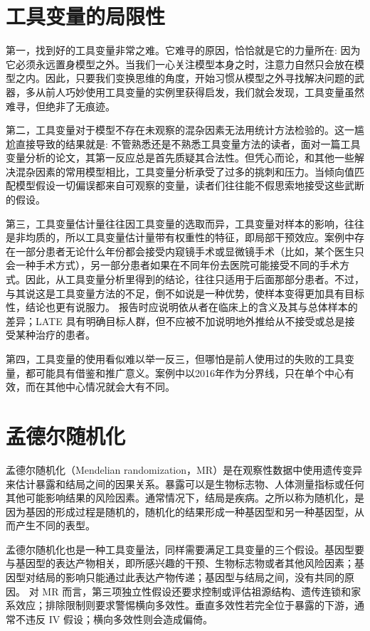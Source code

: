 \documentclass[
  chinese-hans,
  letterpaper,
  DIV=11,
  numbers=noendperiod]{scrreprt}
\begin{document}
\section{工具变量的局限性}\label{ux5de5ux5177ux53d8ux91cfux7684ux5c40ux9650ux6027}

第一，找到好的工具变量非常之难。它难寻的原因，恰恰就是它的力量所在:
因为它必须永远置身模型之外。当我们一心关注模型本身之时，注意力自然只会放在模型之内。因此，只要我们变换思维的角度，开始习惯从模型之外寻找解决问题的武器，多从前人巧妙使用工具变量的实例里获得启发，我们就会发现，工具变量虽然难寻，但绝非了无痕迹。

第二，工具变量对于模型不存在未观察的混杂因素无法用统计方法检验的。这一尴尬直接导致的结果就是:
不管熟悉还是不熟悉工具变量方法的读者，面对一篇工具变量分析的论文，其第一反应总是首先质疑其合法性。但凭心而论，和其他一些解决混杂因素的常用模型相比，工具变量分析承受了过多的挑刺和压力。当倾向值匹配模型假设一切偏误都来自可观察的变量，读者们往往能不假思索地接受这些武断的假设。

第三，工具变量估计量往往因工具变量的选取而异，工具变量对样本的影响，往往是非均质的，所以工具变量估计量带有权重性的特征，即局部干预效应。案例中存在一部分患者无论什么年份都会接受内窥镜手术或显微镜手术（比如，某个医生只会一种手术方式），另一部分患者如果在不同年份去医院可能接受不同的手术方式。因此，从工具变量分析里得到的结论，往往只适用于后面那部分患者。不过，与其说这是工具变量方法的不足，倒不如说是一种优势，使样本变得更加具有目标性，结论也更有说服力。
报告时应说明依从者在临床上的含义及其与总体样本的差异；LATE
具有明确目标人群，但不应被不加说明地外推给从不接受或总是接受某种治疗的患者。

第四，工具变量的使用看似难以举一反三，但哪怕是前人使用过的失败的工具变量，都可能具有借鉴和推广意义。案例中以2016年作为分界线，只在单个中心有效，而在其他中心情况就会大有不同。

\section{孟德尔随机化}\label{ux5b5fux5fb7ux5c14ux968fux673aux5316}

孟德尔随机化（Mendelian
randomization，MR）是在观察性数据中使用遗传变异来估计暴露和结局之间的因果关系。暴露可以是生物标志物、人体测量指标或任何其他可能影响结果的风险因素。通常情况下，结局是疾病。之所以称为随机化，是因为基因的形成过程是随机的，随机化的结果形成一种基因型和另一种基因型，从而产生不同的表型。

孟德尔随机化也是一种工具变量法，同样需要满足工具变量的三个假设。基因型要与基因型的表达产物相关，即所感兴趣的干预、生物标志物或者其他风险因素；基因型对结局的影响只能通过此表达产物传递；基因型与结局之间，没有共同的原因。
对 MR
而言，第三项独立性假设还要求控制或评估祖源结构、遗传连锁和家系效应；排除限制则要求警惕横向多效性。垂直多效性若完全位于暴露的下游，通常不违反
IV 假设；横向多效性则会造成偏倚。
\end{document}
